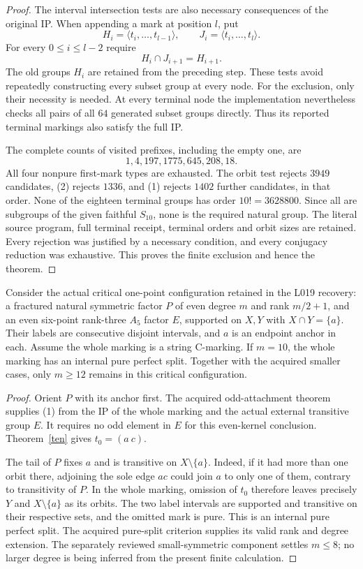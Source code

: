 \documentclass[11pt,a4paper]{article}
\newcommand{\gen}[1]{\langle#1\rangle}
\begin{document}
\begin{proof}
The interval intersection tests are also necessary consequences
of the original IP. When appending a mark at position $l$, put
\[
 H_i=\gen{t_i,\ldots,t_{l-1}},\qquad
 J_i=\gen{t_i,\ldots,t_l}.
\]
For every $0\le i\le l-2$ require
\[
                         H_i\cap J_{i+1}=H_{i+1}.       \tag{2}
\]
The old groups $H_i$ are retained from the preceding step.
These tests avoid repeatedly constructing every subset group at
every node. For the exclusion, only their necessity is needed.
At every terminal node the implementation nevertheless checks
all pairs of all $64$ generated subset groups directly. Thus its
reported terminal markings also satisfy the full IP.

The complete counts of visited prefixes, including the empty one,
are
\[
                      1,4,197,1775,645,208,18.
\]
All four nonpure first-mark types are exhausted. The orbit test
rejects $3949$ candidates, (2) rejects $1336$, and (1) rejects
$1402$ further candidates, in that order. None of the eighteen
terminal groups has order $10!=3628800$. Since all are subgroups
of the given faithful $S_{10}$, none is the required natural group.
The literal source program, full terminal receipt, terminal orders
and orbit sizes are retained. Every rejection was justified by a
necessary condition, and every conjugacy reduction was exhaustive.
This proves the finite exclusion and hence the theorem.
\end{proof}

\begin{theorem}\label{application}
Consider the actual critical one-point configuration retained in
the L019 recovery: a fractured natural symmetric factor $P$ of
even degree $m$ and rank $m/2+1$, and an even six-point rank-three
$A_5$ factor $E$, supported on $X,Y$ with $X\cap Y=\{a\}$.
Their labels are consecutive disjoint intervals, and $a$ is an
endpoint anchor in each. Assume the whole marking is a string
C-marking. If $m=10$, the whole marking has an
internal pure perfect split. Together with the acquired smaller
cases, only $m\ge12$ remains in this critical configuration.
\end{theorem}
\begin{proof}
Orient $P$ with its anchor first. The acquired odd-attachment
theorem supplies (1) from the IP of the whole marking and the
actual external transitive group $E$. It requires no odd element
in $E$ for this even-kernel conclusion. Theorem~\ref{ten} gives
$t_0=(a\ c)$.

The tail of $P$ fixes $a$ and is transitive on $X\setminus\{a\}$.
Indeed, if it had more than one orbit there, adjoining the sole
edge $ac$ could join $a$ to only one of them, contrary to
transitivity of $P$. In the whole marking, omission of $t_0$
therefore leaves precisely $Y$ and $X\setminus\{a\}$ as its
orbits. The two label intervals are supported and transitive on
their respective sets, and the omitted mark is pure. This is an
internal pure perfect split. The acquired pure-split criterion
supplies its valid rank and degree extension. The separately
reviewed small-symmetric component settles $m\le8$; no larger
degree is being inferred from the present finite calculation.
\end{proof}
\end{document}
